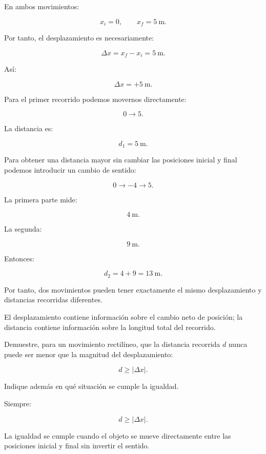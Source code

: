 \begin{explicacion}
En ambos movimientos:

\[
x_i=0,
\qquad
x_f=\SI{5}{\meter}.
\]

Por tanto, el desplazamiento es necesariamente:

\[
\Delta x=x_f-x_i
=
\SI{5}{\meter}.
\]

Así:

\[ \boxed{\Delta x=+\SI{5}{\meter}}. \]

Para el primer recorrido podemos movernos directamente:

\[ 0\longrightarrow5. \]

La distancia es:

\[ d_1=\SI{5}{\meter}. \]

Para obtener una distancia mayor sin cambiar las posiciones inicial y final podemos introducir un cambio de sentido:

\[ 0\longrightarrow-4\longrightarrow5. \]

La primera parte mide:

\[ \SI{4}{\meter}. \]

La segunda:

\[ \SI{9}{\meter}. \]

Entonces:

\[
d_2
=
4+9
=
\SI{13}{\meter}.
\]

Por tanto, dos movimientos pueden tener exactamente el mismo desplazamiento y distancias recorridas diferentes.

El desplazamiento contiene información sobre el cambio neto de posición; la distancia contiene información sobre la longitud total del recorrido.
\end{explicacion}


\begin{ejercicio}
Demuestre, para un movimiento rectilíneo, que la distancia recorrida \(d\) nunca puede ser menor que la magnitud del desplazamiento:

\[ d\geq|\Delta x|. \]

Indique además en qué situación se cumple la igualdad.
\end{ejercicio}

\begin{respuesta}
Siempre:

\[ \boxed{d\geq|\Delta x|}. \]

La igualdad se cumple cuando el objeto se mueve directamente entre las posiciones inicial y final sin invertir el sentido.
\end{respuesta}

